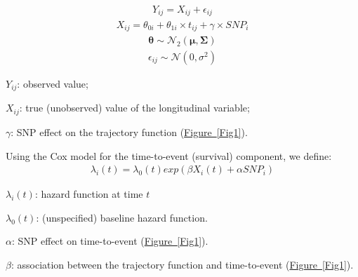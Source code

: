 \documentclass[a0,portrait]{a0poster}
\newcommand\bref[2]{\hyperref[#1]{#2~\ref*{#1}}}
\begin{document}
\begin{multicols}{2}
\begin{minipage}[t]{0.475\columnwidth}
\vspace{-1cm}%
\hspace{-10cm}
{\color{springgreen3}%
\begin{eqnarray}Y_{ij}=X_{ij}+\epsilon_{ij}\nonumber\label{Eq1}\end{eqnarray}
\begin{eqnarray}X_{ij}=\theta_{0i}+\theta_{1i}\times t_{ij}+\gamma \times SNP_i\nonumber\label{Eq2}\end{eqnarray}
\begin{eqnarray}\boldsymbol\theta \sim \mathcal{N}_2(\boldsymbol\mu, \boldsymbol\Sigma)\nonumber\label{Eq3}\end{eqnarray}
\begin{eqnarray}\epsilon_{ij} \sim \mathcal{N}(0, \sigma^2)\nonumber\label{Eq4}\end{eqnarray}
}%
\vspace{-1.5cm}
\end{minipage}%
\hfill\vline\hfill
\begin{minipage}[t]{0.475\columnwidth}%
\vspace{0.8cm}%
\par{{\color{springgreen3}$Y_{ij}$}: observed value;}
\vspace{1.75cm}%
\par{{\color{springgreen3}$X_{ij}$}: true (unobserved) value of the longitudinal variable;}
\vspace{1.75cm}%
\par{{\color{springgreen3}$\gamma$}: SNP effect on the trajectory function (\bref{Fig1}{Figure}).}
\end{minipage}
\vspace{1cm}%
\par{Using the Cox model for the time-to-event (survival) component, we define:}
{\color{springgreen3}\begin{eqnarray}\lambda_i(t)=\lambda_0(t) exp(\beta X_i(t)+\alpha SNP_i)\nonumber\label{Eq5}\end{eqnarray}}
\begin{minipage}[t]{0.475\columnwidth}
\vspace{0.10cm}%
\par{{\color{springgreen3}$\lambda_i(t)$}: hazard function at time {\color{springgreen3}$t$}}
\vspace{1.85cm}%
\par{{\color{springgreen3}$\lambda_0(t)$}: (unspecified) baseline hazard function.}
\end{minipage}%
\hfill\vline\hfill
\begin{minipage}[t]{0.475\columnwidth}%
\vspace{0.10cm}%
\par{{\color{springgreen3}$\alpha$}: SNP effect on time-to-event (\bref{Fig1}{Figure}).}
\par{{\color{springgreen3}$\beta$}: association between the trajectory function and time-to-event (\bref{Fig1}{Figure}).}
\end{minipage}



\end{multicols}
\end{document}

